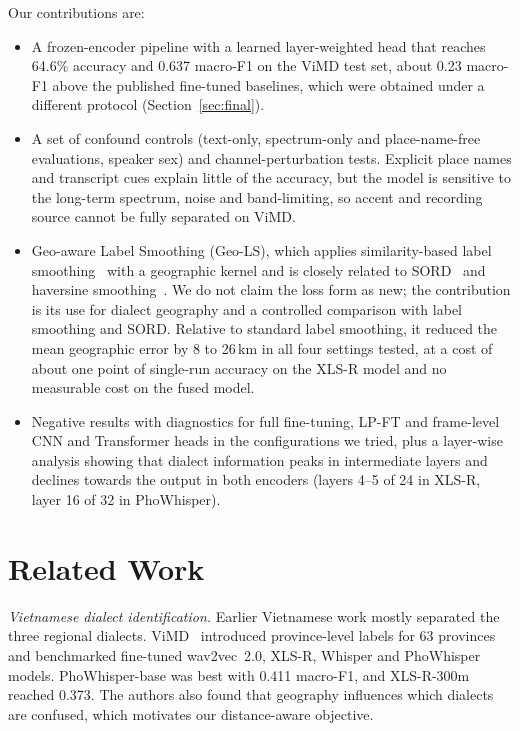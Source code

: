 \documentclass[conference]{IEEEtran}
\begin{document}
Our contributions are:
\begin{itemize}
\item A frozen-encoder pipeline with a learned layer-weighted head that reaches 64.6\% accuracy and 0.637 macro-F1 on the ViMD test set, about 0.23 macro-F1 above the published fine-tuned baselines, which were obtained under a different protocol (Section~\ref{sec:final}).
\item A set of confound controls (text-only, spectrum-only and place-name-free evaluations, speaker sex) and channel-perturbation tests. Explicit place names and transcript cues explain little of the accuracy, but the model is sensitive to the long-term spectrum, noise and band-limiting, so accent and recording source cannot be fully separated on ViMD.
\item Geo-aware Label Smoothing (Geo-LS), which applies similarity-based label smoothing~\cite{saha,liujaja} with a geographic kernel and is closely related to SORD~\cite{sord} and haversine smoothing~\cite{pigeon}. We do not claim the loss form as new; the contribution is its use for dialect geography and a controlled comparison with label smoothing and SORD. Relative to standard label smoothing, it reduced the mean geographic error by 8 to 26\,km in all four settings tested, at a cost of about one point of single-run accuracy on the XLS-R model and no measurable cost on the fused model.
\item Negative results with diagnostics for full fine-tuning, LP-FT and frame-level CNN and Transformer heads in the configurations we tried, plus a layer-wise analysis showing that dialect information peaks in intermediate layers and declines towards the output in both encoders (layers 4--5 of 24 in XLS-R, layer 16 of 32 in PhoWhisper).
\end{itemize}

\section{Related Work}
\textit{Vietnamese dialect identification.} Earlier Vietnamese work mostly separated the three regional dialects. ViMD~\cite{vimd} introduced province-level labels for 63 provinces and benchmarked fine-tuned wav2vec~2.0, XLS-R, Whisper and PhoWhisper models. PhoWhisper-base was best with 0.411 macro-F1, and XLS-R-300m reached 0.373. The authors also found that geography influences which dialects are confused, which motivates our distance-aware objective.
\end{document}
